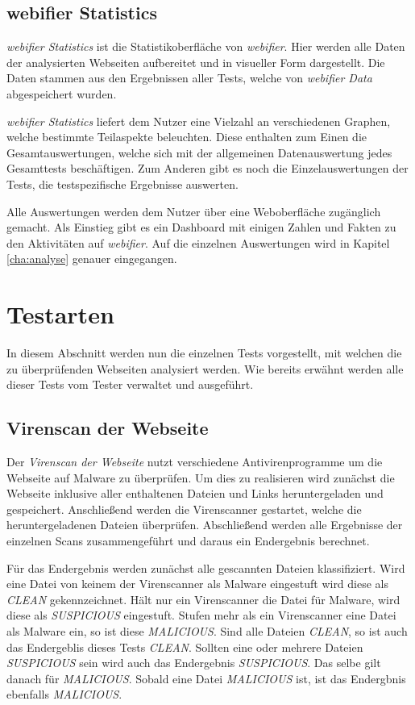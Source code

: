 \subsection{webifier Statistics}
\textit{webifier Statistics} ist die Statistikoberfläche von \textit{webifier}. Hier werden alle
Daten der analysierten Webseiten aufbereitet und in visueller Form dargestellt. Die Daten stammen
aus den Ergebnissen aller Tests, welche von \textit{webifier Data} abgespeichert wurden.

\textit{webifier Statistics} liefert dem Nutzer eine Vielzahl an verschiedenen Graphen, welche
bestimmte Teilaspekte beleuchten. Diese enthalten zum Einen die Gesamtauswertungen, welche sich mit der allgemeinen Datenauswertung jedes Gesamttests beschäftigen. Zum Anderen gibt es noch die Einzelauswertungen der Tests, die testspezifische Ergebnisse auswerten.

Alle Auswertungen werden dem Nutzer über eine Weboberfläche zugänglich gemacht. Als Einstieg gibt es
ein Dashboard mit einigen Zahlen und Fakten zu den Aktivitäten auf \textit{webifier}. Auf
die einzelnen Auswertungen wird in Kapitel \ref{cha:analyse} genauer eingegangen.

\section{Testarten}
\label{sec:konzept-testarten}

In diesem Abschnitt werden nun die einzelnen Tests vorgestellt, mit welchen die zu überprüfenden
Webseiten analysiert werden. Wie bereits erwähnt werden alle dieser Tests vom Tester verwaltet und
ausgeführt.

\subsection{Virenscan der Webseite}

Der \textit{Virenscan der Webseite} nutzt verschiedene Antivirenprogramme um die Webseite auf
Malware zu überprüfen.
Um dies zu realisieren wird zunächst die Webseite inklusive aller enthaltenen Dateien und Links
heruntergeladen und gespeichert. Anschließend werden die Virenscanner gestartet, welche die
heruntergeladenen Dateien überprüfen. Abschließend werden alle Ergebnisse der einzelnen Scans
zusammengeführt und daraus ein Endergebnis berechnet.

Für das Endergebnis werden zunächst alle gescannten Dateien klassifiziert. Wird eine Datei von
keinem der Virenscanner als Malware eingestuft wird diese als \textit{CLEAN} gekennzeichnet.
Hält nur ein Virenscanner die Datei für Malware, wird diese als \textit{SUSPICIOUS}
eingestuft. Stufen mehr als ein Virenscanner eine Datei als Malware ein, so ist diese
\textit{MALICIOUS}.
Sind alle Dateien \textit{CLEAN}, so ist auch das Endergeblis dieses Tests
\textit{CLEAN}. Sollten eine oder mehrere Dateien \textit{SUSPICIOUS} sein wird auch das Endergebnis
\textit{SUSPICIOUS}. Das selbe gilt danach für \textit{MALICIOUS}. Sobald eine Datei
\textit{MALICIOUS} ist, ist das Endergbnis ebenfalls \textit{MALICIOUS}.


